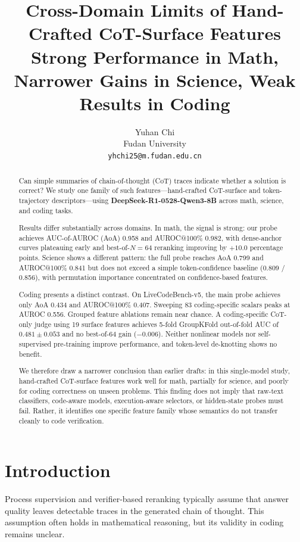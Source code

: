 \documentclass[10pt,twocolumn]{article}
\title{\textbf{Cross-Domain Limits of Hand-Crafted CoT-Surface Features}\\[4pt]
\large Strong Performance in Math, Narrower Gains in Science, Weak Results in Coding}
\author{Yuhan Chi\\Fudan University\\\texttt{yhchi25@m.fudan.edu.cn}}
\date{}
\begin{document}
\maketitle

\begin{abstract}
Can simple summaries of chain-of-thought (CoT) traces indicate whether a solution is correct? We study one family of such features---hand-crafted CoT-surface and token-trajectory descriptors---using \textbf{DeepSeek-R1-0528-Qwen3-8B} across math, science, and coding tasks.

Results differ substantially across domains. In math, the signal is strong: our probe achieves AUC-of-AUROC (AoA) 0.958 and AUROC@100\% 0.982, with dense-anchor curves plateauing early and best-of-$N=64$ reranking improving by $+10.0$ percentage points. Science shows a different pattern: the full probe reaches AoA 0.799 and AUROC@100\% 0.841 but does not exceed a simple token-confidence baseline (0.809 / 0.856), with permutation importance concentrated on confidence-based features.

Coding presents a distinct contrast. On LiveCodeBench-v5, the main probe achieves only AoA 0.434 and AUROC@100\% 0.407. Sweeping 83 coding-specific scalars peaks at AUROC 0.556. Grouped feature ablations remain near chance. A coding-specific CoT-only judge using 19 surface features achieves 5-fold GroupKFold out-of-fold AUC of $0.481 \pm 0.053$ and no best-of-$64$ gain ($-0.006$). Neither nonlinear models nor self-supervised pre-training improve performance, and token-level de-knotting shows no benefit.

We therefore draw a narrower conclusion than earlier drafts: in this single-model study, hand-crafted CoT-surface features work well for math, partially for science, and poorly for coding correctness on unseen problems. This finding does not imply that raw-text classifiers, code-aware models, execution-aware selectors, or hidden-state probes must fail. Rather, it identifies one specific feature family whose semantics do not transfer cleanly to code verification.
\end{abstract}

\section{Introduction}

Process supervision and verifier-based reranking typically assume that answer quality leaves detectable traces in the generated chain of thought. This assumption often holds in mathematical reasoning, but its validity in coding remains unclear.
\end{document}
